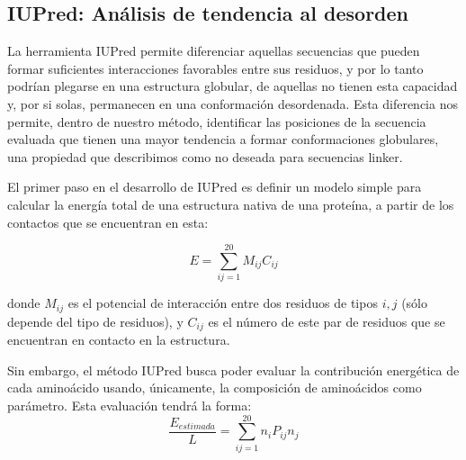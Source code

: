 \subsection{IUPred: Análisis de tendencia al desorden} \label{iupred}

La herramienta IUPred \cite{dosztanyi2005pairwise} permite diferenciar aquellas secuencias que pueden formar suficientes interacciones favorables entre sus residuos, y por lo tanto podrían plegarse en una estructura globular, 
de aquellas no tienen esta capacidad y, por si solas, permanecen en una conformación desordenada.
Esta diferencia nos permite, dentro de nuestro método, identificar las posiciones de la secuencia evaluada que tienen una mayor tendencia a formar conformaciones globulares, 
una propiedad que describimos como no deseada para secuencias linker.




El primer paso en el desarrollo de IUPred es definir un modelo simple para calcular la energía total de una estructura nativa de una proteína, a partir de los contactos que se encuentran en esta:

\begin{equation}\label{modelo1}
E = \sum_{ij=1}^{20} M_{ij}C_{ij}
\end{equation}

\noindent donde $M_{ij}$ es el potencial de interacción entre dos residuos de tipos $i,j$ (sólo depende del tipo de residuos), y $C_{ij}$ es el número de este par de residuos que se encuentran en contacto en la estructura.

Sin embargo, el método IUPred busca poder evaluar la contribución energética de cada aminoácido usando, únicamente, la composición de aminoácidos como parámetro. 
Esta evaluación tendrá la forma: 
\begin{equation}\label{modelo2}
\frac{E_{estimada}}{L} = \sum_{ij=1}^{20} n_{i}P_{ij}n_{j}
\end{equation}

